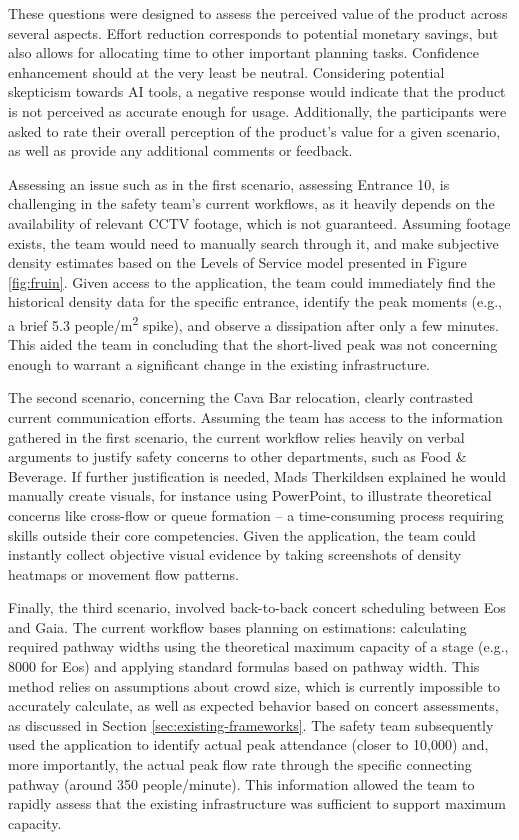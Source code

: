 These questions were designed to assess the perceived value of the product across several aspects. Effort reduction corresponds to potential monetary savings, but also allows for allocating time to other important planning tasks. Confidence enhancement should at the very least be neutral. Considering potential skepticism towards AI tools, a negative response would indicate that the product is not perceived as accurate enough for usage. Additionally, the participants were asked to rate their overall perception of the product's value for a given scenario, as well as provide any additional comments or feedback.

Assessing an issue such as in the first scenario, assessing Entrance 10, is challenging in the safety team's current workflows, as it heavily depends on the availability of relevant CCTV footage, which is not guaranteed. Assuming footage exists, the team would need to manually search through it, and make subjective density estimates based on the Levels of Service model presented in Figure \ref{fig:fruin}. Given access to the application, the team could immediately find the historical density data for the specific entrance, identify the peak moments (e.g., a brief 5.3 people/m\textsuperscript{2} spike), and observe a dissipation after only a few minutes. This aided the team in concluding that the short-lived peak was not concerning enough to warrant a significant change in the existing infrastructure.

The second scenario, concerning the Cava Bar relocation, clearly contrasted current communication efforts. Assuming the team has access to the information gathered in the first scenario, the current workflow relies heavily on verbal arguments to justify safety concerns to other departments, such as Food \& Beverage. If further justification is needed, Mads Therkildsen explained he would manually create visuals, for instance using PowerPoint, to illustrate theoretical concerns like cross-flow or queue formation -- a time-consuming process requiring skills outside their core competencies. Given the application, the team could instantly collect objective visual evidence by taking screenshots of density heatmaps or movement flow patterns.

Finally, the third scenario, involved back-to-back concert scheduling between Eos and Gaia. The current workflow bases planning on estimations: calculating required pathway widths using the theoretical maximum capacity of a stage (e.g., 8000 for Eos) and applying standard formulas based on pathway width. This method relies on assumptions about crowd size, which is currently impossible to accurately calculate, as well as expected behavior based on concert assessments, as discussed in Section \ref{sec:existing-frameworks}. The safety team subsequently used the application to identify actual peak attendance (closer to 10,000) and, more importantly, the actual peak flow rate through the specific connecting pathway (around 350 people/minute). This information allowed the team to rapidly assess that the existing infrastructure was sufficient to support maximum capacity.


